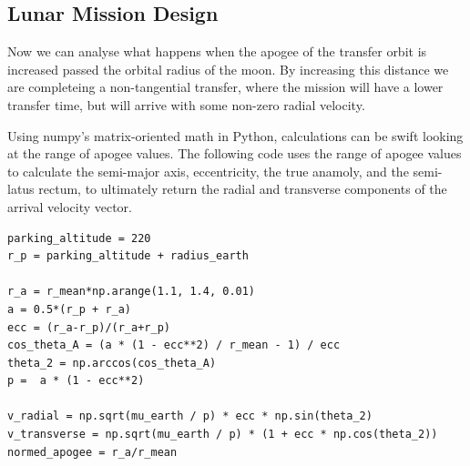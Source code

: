 \documentclass[12pt,twocolumn]{article}  %
\begin{document}
\subsection{Lunar Mission Design}

\noindent Now we can analyse what happens when the apogee of the transfer orbit is increased passed the 
orbital radius of the moon. By increasing this distance 
we are completeing a non-tangential transfer, where the mission will have a lower transfer time, but will arrive
with some non-zero radial velocity.

Using numpy's matrix-oriented math in Python, calculations can be swift looking at the range of 
apogee values. The following code uses the range of apogee values to calculate the semi-major axis, eccentricity, the true anamoly, and the semi-latus rectum,
to ultimately return the radial and transverse components of the arrival velocity vector. 
\begin{lstlisting}
parking_altitude = 220
r_p = parking_altitude + radius_earth

r_a = r_mean*np.arange(1.1, 1.4, 0.01)
a = 0.5*(r_p + r_a)
ecc = (r_a-r_p)/(r_a+r_p)
cos_theta_A = (a * (1 - ecc**2) / r_mean - 1) / ecc
theta_2 = np.arccos(cos_theta_A)
p =  a * (1 - ecc**2)

v_radial = np.sqrt(mu_earth / p) * ecc * np.sin(theta_2)
v_transverse = np.sqrt(mu_earth / p) * (1 + ecc * np.cos(theta_2))
normed_apogee = r_a/r_mean
\end{lstlisting} 
\end{document}
